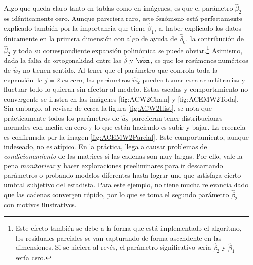 Algo que queda claro tanto en tablas como en imágenes, es que el parámetro $\hat{\beta}_2$ es idénticamente cero. Aunque pareciera raro, este fenómeno está perfectamente explicado también por la importancia que tiene $\hat{\beta}_1$, al haber explicado los datos únicamente en la primera dimensión con algo de ayuda de $\hat{\beta}_0$, la contribución de $\hat{\beta}_2$ y toda su correspondiente expansión polinómica se puede obviar.\footnote{Este efecto también se debe a la forma que está implementado el algoritmo, los residuales parciales se van capturando de forma ascendente en las dimensiones. Si se hiciera al revés, el parámetro significativo sería $\hat{\beta}_2$ y $\hat{\beta}_1$ sería cero.} Asimismo, dada la falta de ortogonalidad entre las $\hat{\beta}$ y $\hat{\wsn}$, es que los resúmenes numéricos de $\hat{w}_2$ no tienen sentido. Al tener que el parámetro que controla toda la expansión de $j = 2$ es cero, los parámetros $\hat{w}_2$ pueden tomar escalar arbitrarias y fluctuar todo lo quieran sin afectar al modelo. Estas escalas y comportamiento no convergente se ilustra en las imágenes \ref{fig:ACW2Chain} y \ref{fig:ACEMW2Toda}. Sin embargo, al revisar de cerca la figura \ref{fig:ACW2Hist}, se nota que prácticamente todos los parámetros de $\hat{w}_2$ parecieran tener distribuciones normales con media en cero y lo que están haciendo es subir y bajar. La creencia es confirmada por la imagen \ref{fig:ACEMW2Parcial}. Este comportamiento, aunque indeseado, no es atípico. En la práctica, llega a causar problemas de \textit{condicionamiento} de las matrices si las cadenas son muy largas. Por ello, vale la pena \textit{monitoriear} y hacer exploraciones preeliminares para ir descartando parámetros o probando modelos diferentes hasta lograr uno que satisfaga cierto umbral subjetivo del estadista. Para este ejemplo, no tiene mucha relevancia dado que las cadenas convergen rápido, por lo que se toma el segundo parámetro $\hat{\beta}_2$ con motivos ilustrativos.

